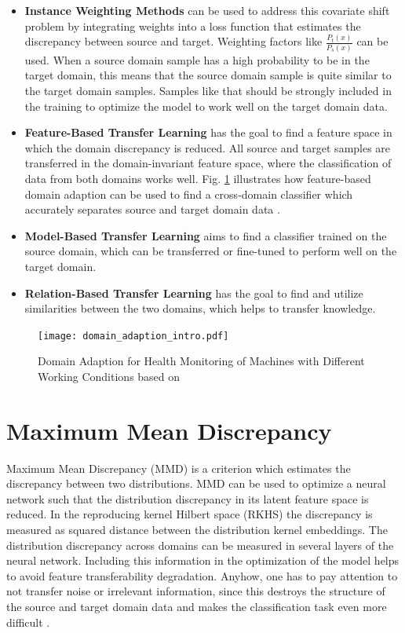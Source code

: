 \begin{itemize}
\item \textbf{Instance Weighting Methods} can be used to address this covariate shift problem by integrating weights into a loss function that estimates the discrepancy between source and target. Weighting factors like $\frac{P_{t}(x)}{P_{s}(x)}$ can be used. When a source domain sample has a high probability to be in the target domain, this means that the source domain sample is quite similar to the target domain samples. Samples like that should be strongly included in the training to optimize the model to work well on the target domain data.
\item \textbf{Feature-Based Transfer Learning} has the goal to find a feature space in which the domain discrepancy is reduced. All source and target samples are transferred in the domain-invariant feature space, where the classification of data from both domains works well. Fig. \ref{fig:Domain_adaption_intro} illustrates how feature-based domain adaption can be used to find a cross-domain classifier which accurately separates source and target domain data \cite{Pandhare2021}. 
\item \textbf{Model-Based Transfer Learning} aims to find a classifier trained on the source domain, which can be transferred or fine-tuned to perform well on the target domain.
\item \textbf{Relation-Based Transfer Learning} has the goal to find and utilize similarities between the two domains, which helps to transfer knowledge. 
\end{itemize}

\begin{figure}[H]
  \centering
  \texttt{[image: domain\_adaption\_intro.pdf]}
  \caption {Domain Adaption for Health Monitoring of Machines with Different Working Conditions based on \cite{Pandhare2021}} \label{fig:Domain_adaption_intro}
\end{figure}


\section{Maximum Mean Discrepancy}
Maximum Mean Discrepancy (MMD) is a criterion which estimates the discrepancy between two distributions. MMD can be used to optimize a neural network such that the distribution discrepancy in its latent feature space is reduced. In the reproducing kernel Hilbert space (RKHS) the discrepancy is measured as squared distance between the distribution kernel embeddings. The distribution discrepancy across domains can be measured in several layers of the neural network. Including this information in the optimization of the model helps to avoid feature transferability degradation. Anyhow, one has to pay attention to not transfer noise or irrelevant information, since this destroys the structure of the source and target domain data and makes the classification task even more difficult \cite{li2020}. 

